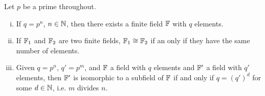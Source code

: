 \documentclass{../mathnotes}
\begin{document}
\begin{thm}
    Let $p$ be a prime throughout.
    \begin{enumerate}[(i)]
        \item If $q=p^n$, $n\in \mathbb{N}$, then there exists a finite field $\mathbb{F}$ with $q$ elements.
        \item If $\mathbb{F}_1$ and $\mathbb{F}_2$ are two finite fields, $\mathbb{F}_1\cong\mathbb{F}_2$ if an only if they have the same number of elements.
        \item Given $q=p^n$, $q'=p^m$, and $\mathbb{F}$ a field with $q$ elements and $\mathbb{F}'$ a field with $q'$ elements,
            then $\mathbb{F}'$ is isomorphic to a subfield of $\mathbb{F}$ if and only if $q=(q')^d$ for some $d\in \mathbb{N}$, i.e. $m$ divides $n$.
    \end{enumerate}
\end{thm}
\end{document}
